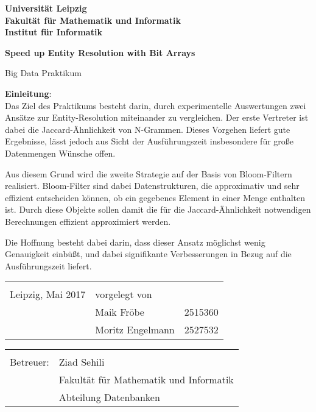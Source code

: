 \documentclass[a4paper,ngerman,twoside,BCOR1.5cm,headsepline,DIV12,appendixprefix,final,12pt]{scrartcl}
\begin{document}
\thispagestyle{empty}

\begin{center}
\large

\vspace{1cm}
\textbf{\sffamily	Universität Leipzig\\
			Fakultät für Mathematik und Informatik\\
			Institut für Informatik\\}

\vspace{2cm}
{\Large\textbf{\sffamily Speed up Entity Resolution with Bit Arrays}}


\large

Big Data Praktikum
\vspace{1cm}
\end{center}

\textbf{Einleitung}:\\
Das Ziel des Praktikums besteht darin, durch experimentelle Auswertungen zwei Ansätze zur Entity-Resolution miteinander
zu vergleichen.
Der erste Vertreter ist dabei die Jaccard-Ähnlichkeit von N-Grammen.
Dieses Vorgehen liefert gute Ergebnisse, lässt jedoch aus Sicht der Ausführungszeit insbesondere für große Datenmengen Wünsche offen.

Aus diesem Grund wird die zweite Strategie auf der Basis von Bloom-Filtern realisiert.
Bloom-Filter sind dabei Datenstrukturen, die approximativ und sehr effizient entscheiden können,
ob ein gegebenes Element in einer Menge enthalten ist.
Durch diese Objekte sollen damit die für die Jaccard-Ähnlichkeit notwendigen Berechnungen effizient approximiert werden.

Die Hoffnung besteht dabei darin, dass dieser Ansatz möglichst wenig Genauigkeit einbüßt,
und dabei signifikante Verbesserungen in Bezug auf die Ausführungszeit liefert.


\vfill

{\large
\begin{tabular}{p{7cm} ll}
&\\
\small
Leipzig, Mai 2017 & \small vorgelegt von\\
				& \small Maik Fröbe & \small 2515360\\

				& \small Moritz Engelmann & \small 2527532\\
\end{tabular}}

\begin{tabular}{p{7cm} l}
&\\
\small
Betreuer:	& \small Ziad Sehili \\
			& \small Fakultät für Mathematik und Informatik\\
			& \small Abteilung Datenbanken
\end{tabular} 

\newpage


\newpage

\newpage

\newpage

\end{document}
